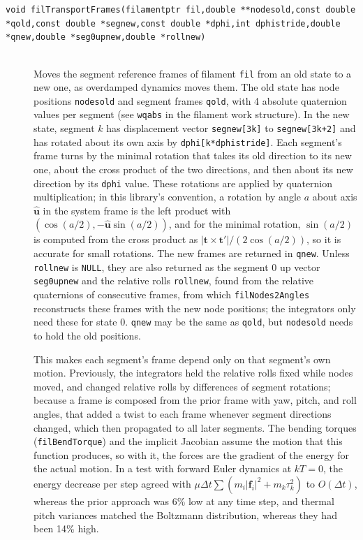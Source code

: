 \documentclass {scrbook}
\newcommand {\ttt} {\texttt}
\begin{document}
\begin{description}
\item[\ttt{void filTransportFrames(filamentptr fil,double **nodesold,const double *qold,const double *segnew,const double *dphi,int dphistride,double *qnew,double *seg0upnew,double *rollnew)}]
\hfill \\
Moves the segment reference frames of filament \ttt{fil} from an old state to a new one, as overdamped dynamics moves them. The old state has node positions \ttt{nodesold} and segment frames \ttt{qold}, with 4 absolute quaternion values per segment (see \ttt{wqabs} in the filament work structure). In the new state, segment $k$ has displacement vector \ttt{segnew[3k]} to \ttt{segnew[3k+2]} and has rotated about its own axis by \ttt{dphi[k*dphistride]}. Each segment's frame turns by the minimal rotation that takes its old direction to its new one, about the cross product of the two directions, and then about its new direction by its \ttt{dphi} value. These rotations are applied by quaternion multiplication; in this library's convention, a rotation by angle $a$ about axis $\hat{\bm{u}}$ in the system frame is the left product with $(\cos(a/2),-\hat{\bm{u}}\sin(a/2))$, and for the minimal rotation, $\sin(a/2)$ is computed from the cross product as $|\bm{t}\times\bm{t}'|/(2\cos(a/2))$, so it is accurate for small rotations. The new frames are returned in \ttt{qnew}. Unless \ttt{rollnew} is \ttt{NULL}, they are also returned as the segment 0 up vector \ttt{seg0upnew} and the relative rolls \ttt{rollnew}, found from the relative quaternions of consecutive frames, from which \ttt{filNodes2Angles} reconstructs these frames with the new node positions; the integrators only need these for state 0. \ttt{qnew} may be the same as \ttt{qold}, but \ttt{nodesold} needs to hold the old positions.

This makes each segment's frame depend only on that segment's own motion. Previously, the integrators held the relative rolls fixed while nodes moved, and changed relative rolls by differences of segment rotations; because a frame is composed from the prior frame with yaw, pitch, and roll angles, that added a twist to each frame whenever segment directions changed, which then propagated to all later segments. The bending torques (\ttt{filBendTorque}) and the implicit Jacobian assume the motion that this function produces, so with it, the forces are the gradient of the energy for the actual motion. In a test with forward Euler dynamics at $kT=0$, the energy decrease per step agreed with $\mu\Delta t\sum(m_i|\bm{f}_i|^2+m_k\tau_k^2)$ to $O(\Delta t)$, whereas the prior approach was 6\% low at any time step, and thermal pitch variances matched the Boltzmann distribution, whereas they had been 14\% high.


\end{description}
\end{document}

